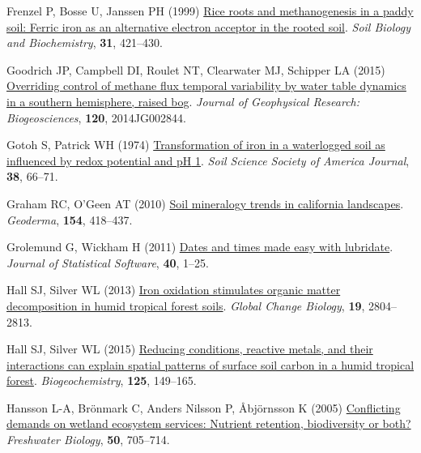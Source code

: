 \documentclass[
  12pt,
]{article}
\newlength{\cslhangindent}
\newenvironment{CSLReferences}[2] %
 {\begin{list}{}{%
  \setlength{\itemindent}{0pt}
  \setlength{\leftmargin}{0pt}
  \setlength{\parsep}{0pt}
  \ifodd #1
   \setlength{\leftmargin}{\cslhangindent}
   \setlength{\itemindent}{-1\cslhangindent}
  \fi
  \setlength{\itemsep}{#2\baselineskip}}}
 {\end{list}}
\begin{document}
\begin{CSLReferences}{1}{0}
Frenzel P, Bosse U, Janssen PH (1999)
\href{https://doi.org/10.1016/S0038-0717(98)00144-8}{Rice roots and
methanogenesis in a paddy soil: Ferric iron as an alternative electron
acceptor in the rooted soil}. \emph{Soil Biology and Biochemistry},
\textbf{31}, 421--430.

Goodrich JP, Campbell DI, Roulet NT, Clearwater MJ, Schipper LA (2015)
\href{https://doi.org/10.1002/2014JG002844}{Overriding control of
methane flux temporal variability by water table dynamics in a southern
hemisphere, raised bog}. \emph{Journal of Geophysical Research:
Biogeosciences}, \textbf{120}, 2014JG002844.

Gotoh S, Patrick WH (1974)
\href{https://doi.org/10.2136/sssaj1974.03615995003800010024x}{Transformation
of iron in a waterlogged soil as influenced by redox potential and {pH}
1}. \emph{Soil Science Society of America Journal}, \textbf{38}, 66--71.

Graham RC, O'Geen AT (2010)
\href{https://doi.org/10.1016/j.geoderma.2009.05.018}{Soil mineralogy
trends in california landscapes}. \emph{Geoderma}, \textbf{154},
418--437.

Grolemund G, Wickham H (2011)
\href{http://www.jstatsoft.org/v40/i03/}{Dates and times made easy with
{lubridate}}. \emph{Journal of Statistical Software}, \textbf{40},
1--25.

Hall SJ, Silver WL (2013) \href{https://doi.org/10.1111/gcb.12229}{Iron
oxidation stimulates organic matter decomposition in humid tropical
forest soils}. \emph{Global Change Biology}, \textbf{19}, 2804--2813.

Hall SJ, Silver WL (2015)
\href{https://doi.org/10.1007/s10533-015-0120-5}{Reducing conditions,
reactive metals, and their interactions can explain spatial patterns of
surface soil carbon in a humid tropical forest}. \emph{Biogeochemistry},
\textbf{125}, 149--165.

Hansson L-A, Brönmark C, Anders Nilsson P, Åbjörnsson K (2005)
\href{https://doi.org/10.1111/j.1365-2427.2005.01352.x}{Conflicting
demands on wetland ecosystem services: Nutrient retention, biodiversity
or both?} \emph{Freshwater Biology}, \textbf{50}, 705--714.


\end{CSLReferences}
\end{document}
